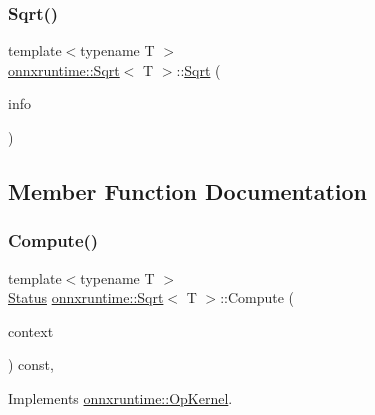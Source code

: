 \subsubsection{\texorpdfstring{Sqrt()}{Sqrt()}}
{\footnotesize\ttfamily template$<$typename T $>$ \\
\mbox{\hyperlink{classonnxruntime_1_1Sqrt}{onnxruntime\+::\+Sqrt}}$<$ T $>$\+::\mbox{\hyperlink{classonnxruntime_1_1Sqrt}{Sqrt}} (\begin{DoxyParamCaption}\item[{const \mbox{\hyperlink{classonnxruntime_1_1OpKernelInfo}{Op\+Kernel\+Info}} \&}]{info }\end{DoxyParamCaption})\hspace{0.3cm}{\ttfamily [inline]}}



\subsection{Member Function Documentation}
\mbox{\label{classonnxruntime_1_1Sqrt_a12ddb9274f4ecd6407dfc9f078ef1b40}} 
\subsubsection{\texorpdfstring{Compute()}{Compute()}\hspace{0.1cm}{\footnotesize\ttfamily [1/2]}}
{\footnotesize\ttfamily template$<$typename T $>$ \\
\mbox{\hyperlink{classonnxruntime_1_1common_1_1Status}{Status}} \mbox{\hyperlink{classonnxruntime_1_1Sqrt}{onnxruntime\+::\+Sqrt}}$<$ T $>$\+::Compute (\begin{DoxyParamCaption}\item[{\mbox{\hyperlink{classonnxruntime_1_1OpKernelContext}{Op\+Kernel\+Context}} $\ast$}]{context }\end{DoxyParamCaption}) const\hspace{0.3cm}{\ttfamily [override]}, {\ttfamily [virtual]}}



Implements \mbox{\hyperlink{classonnxruntime_1_1OpKernel_a9eca8656a78b1b3ab9d3351a12798650}{onnxruntime\+::\+Op\+Kernel}}.

\mbox{\label{classonnxruntime_1_1Sqrt_a85dc8d7f5eb34c65f6e0a1ea005f2fb5}} 
